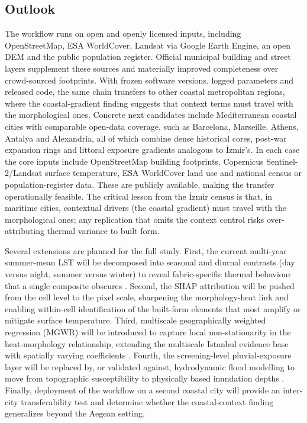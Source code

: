 \subsection{Outlook}
\label{sec:disc-transfer}
The workflow runs on open and openly licensed inputs, including OpenStreetMap, ESA
WorldCover, Landsat via Google Earth Engine, an open DEM and the public population
register. Official municipal building and street layers supplement these sources and
materially improved completeness over crowd-sourced footprints. With frozen
software versions, logged parameters and released code, the same chain transfers to
other coastal metropolitan regions, where the coastal-gradient finding suggests
that context terms must travel with the morphological ones. Concrete next
candidates include Mediterranean coastal cities with comparable open-data coverage,
such as Barcelona, Marseille, Athens, Antalya and Alexandria, all of which combine
dense historical cores, post-war expansion rings and littoral exposure gradients
analogous to \.{I}zmir's. In each case the core inputs include OpenStreetMap building
footprints, Copernicus Sentinel-2/Landsat surface temperature, ESA WorldCover land
use and national census or population-register data. These are publicly available,
making the transfer operationally feasible. The critical lesson from the \.{I}zmir
census is that, in maritime cities, contextual drivers (the coastal gradient) must
travel with the morphological ones; any replication that omits the context control
risks over-attributing thermal variance to built form.

\label{sec:disc-future}
Several extensions are planned for the full study. First, the current multi-year
summer-mean LST will be decomposed into seasonal and diurnal contrasts (day versus
night, summer versus winter) to reveal fabric-specific thermal behaviour that a
single composite obscures \citep{wangZ2025MarginalInteraction}. Second, the SHAP
attribution will be pushed from the cell level to the pixel scale, sharpening the
morphology-heat link and enabling within-cell identification of the built-form
elements that most amplify or mitigate surface temperature. Third, multiscale
geographically weighted regression (MGWR) will be introduced to capture local
non-stationarity in the heat-morphology relationship, extending the multiscale
Istanbul evidence base with spatially varying coefficients
\citep{zhao2018GeographWeighted, eminoglu2026Diagnosing}. Fourth, the
screening-level pluvial-exposure
layer will be replaced by, or validated against, hydrodynamic flood modelling to
move from topographic susceptibility to physically based inundation depths
\citep{imroz2025IntegratedAssess}. Finally, deployment of the workflow on a second
coastal city will provide an inter-city transferability test and determine whether
the coastal-context finding generalizes beyond the Aegean setting.
